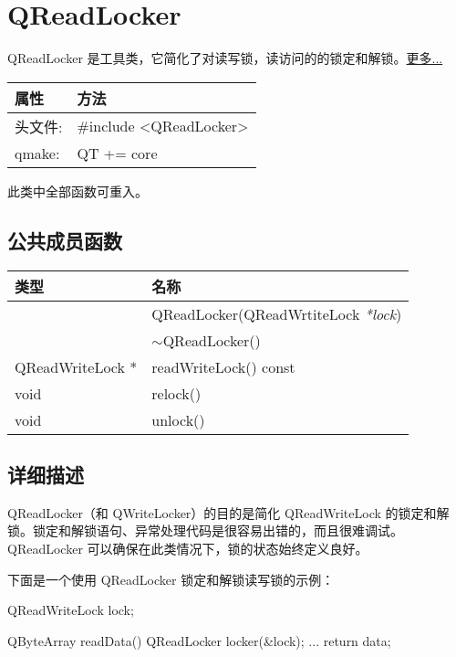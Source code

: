 \chapter{QReadLocker}

QReadLocker 是工具类，它简化了对读写锁，读访问的的锁定和解锁。\href{https://gitee.com/wcc210/QtDocumentCN/blob/master/Src/R/QReadLocker/QReadLocker.md#%E8%AF%A6%E7%BB%86%E6%8F%8F%E8%BF%B0}{更多...}

\begin{tabular}{|l|l|}
\hline
属性 &	方法\\
\hline
头文件:& 	\#include <QReadLocker>\\
\hline
qmake:& 	QT += core\\
\hline
\end{tabular}

\begin{notice}
此类中全部函数可重入。
\end{notice}

\section{公共成员函数}

\begin{tabular}{|l|m{23em}|}
\hline
类型 &	名称\\
\hline
 &	QReadLocker(QReadWrtiteLock \emph{*lock}) \\
\hline
 &	$\sim$QReadLocker() \\ 
\hline
QReadWriteLock * &	readWriteLock() const \\ 
\hline
void &	relock() \\ 
\hline
void &	unlock() \\
\hline
\end{tabular}

\section{详细描述}

QReadLocker（和 QWriteLocker）的目的是简化 QReadWriteLock 的锁定和解锁。锁定和解锁语句、异常处理代码是很容易出错的，而且很难调试。QReadLocker 可以确保在此类情况下，锁的状态始终定义良好。

下面是一个使用 QReadLocker 锁定和解锁读写锁的示例：

\begin{cppcode}
QReadWriteLock lock;

QByteArray readData()
{
    QReadLocker locker(&lock);
    ...
    return data;
}
\end{cppcode}

